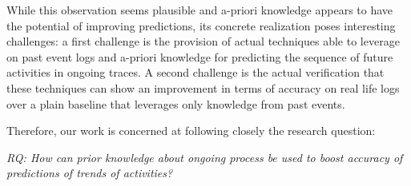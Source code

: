 While this observation seems plausible and a-priori knowledge appears to have the potential of improving predictions, its concrete realization poses interesting challenges: a first challenge is the provision of actual techniques able to leverage on past event logs and a-priori knowledge for predicting the sequence of future activities in ongoing traces. A second challenge is the actual verification that these techniques can show an improvement in terms of accuracy on real life logs over a plain baseline that leverages only knowledge from past events.

Therefore, our work is concerned at following closely the research question:

\textit{RQ: How can prior knowledge about ongoing process be used to boost accuracy of predictions of trends of activities?}


